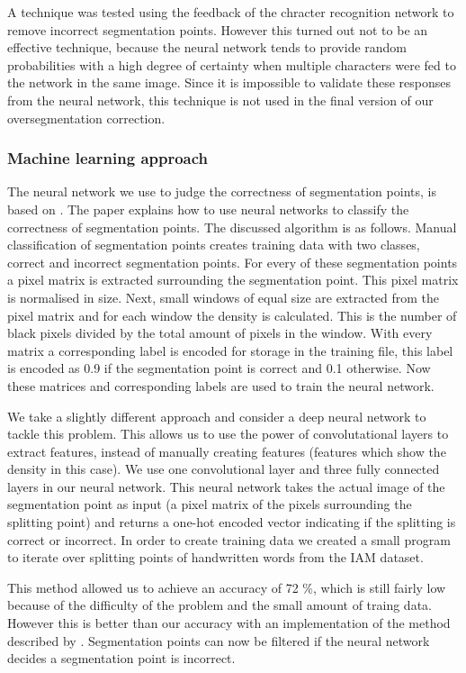 \documentclass{article}
\begin{document}
A technique was tested using the feedback of the chracter recognition network to remove incorrect segmentation points.
However this turned out not to be an effective technique, because the neural network tends to provide random probabilities with a high degree of certainty when multiple characters were fed to the network in the same image.
Since it is impossible to validate these responses from the neural network, this technique is not used in the final version of our oversegmentation correction.

\subsubsection{Machine learning approach}
The neural network we use to judge the correctness of segmentation points, is based on \cite{evalsplitpointsnn}. The paper explains how to use neural networks to classify the correctness of segmentation points. The discussed algorithm is as follows. Manual classification of segmentation points creates training data with two classes, correct and incorrect segmentation points.
For every of these segmentation points a pixel matrix is extracted surrounding the segmentation point. This pixel matrix is normalised in size.
Next, small windows of equal size are extracted from the pixel matrix and for each window the density is calculated. This is the number of black pixels divided by the total amount of pixels in the window.
With every matrix a corresponding label is encoded for storage in the training file, this label is encoded as 0.9 if the segmentation point is correct and 0.1 otherwise. Now these matrices and corresponding labels are used to train the neural network.

We take a slightly different approach and consider a deep neural network to tackle this problem. This allows us to use the power of convolutational layers to extract features, instead of manually creating features (features which show the density in this case).
We use one convolutional layer and three fully connected layers in our neural network. This neural network takes the actual image of the segmentation point as input (a pixel matrix of the pixels surrounding the splitting point) and returns a one-hot encoded vector indicating if the splitting is correct or incorrect. In order to create training data we created a small program to iterate over splitting points of handwritten words from the IAM dataset. \cite{iam}

This method allowed us to achieve an accuracy of 72 \%, which is still fairly low because of the difficulty of the problem and the small amount of traing data. However this is better than our accuracy with an implementation of the method described by \cite{evalsplitpointsnn}.
Segmentation points can now be filtered if the neural network decides a segmentation point is incorrect.
\end{document}
